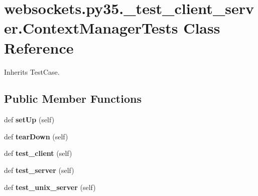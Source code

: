 \hypertarget{classwebsockets_1_1py35_1_1__test__client__server_1_1_context_manager_tests}{}\section{websockets.\+py35.\+\_\+test\+\_\+client\+\_\+server.\+Context\+Manager\+Tests Class Reference}
\label{classwebsockets_1_1py35_1_1__test__client__server_1_1_context_manager_tests}


Inherits Test\+Case.

\subsection*{Public Member Functions}
\begin{DoxyCompactItemize}
\item 
\mbox{\label{classwebsockets_1_1py35_1_1__test__client__server_1_1_context_manager_tests_a9e746b4598568736ddf086d1c28dda3e}} 
def {\bfseries set\+Up} (self)
\item 
\mbox{\label{classwebsockets_1_1py35_1_1__test__client__server_1_1_context_manager_tests_a9a2aa80926b9aef67e1c44dd576da0ed}} 
def {\bfseries tear\+Down} (self)
\item 
\mbox{\label{classwebsockets_1_1py35_1_1__test__client__server_1_1_context_manager_tests_a7ef70e3abcde56452953185c631f73c2}} 
def {\bfseries test\+\_\+client} (self)
\item 
\mbox{\label{classwebsockets_1_1py35_1_1__test__client__server_1_1_context_manager_tests_ae4bdac0e06e1ba3366b574c7f2faa6f4}} 
def {\bfseries test\+\_\+server} (self)
\item 
\mbox{\label{classwebsockets_1_1py35_1_1__test__client__server_1_1_context_manager_tests_a33ab193e47d53b26571185483e957ee4}} 
def {\bfseries test\+\_\+unix\+\_\+server} (self)
\end{DoxyCompactItemize}
